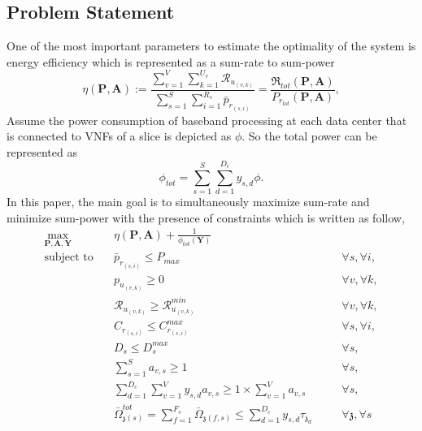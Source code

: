 \documentclass[conference]{IEEEtran}
\begin{document}
\subsection{Problem Statement}
One of the most important parameters to estimate the optimality of the system is energy efficiency which is represented as a sum-rate to sum-power 
\begin{equation}
\eta(\boldsymbol{P},\boldsymbol{A}) := \frac{\sum\limits_{v=1}^{V} \sum\limits_{k=1}^{{U}_v}\mathcal{R}_{u_{(v,k)}} }{\sum\limits_{s=1}^{S} \sum\limits_{i=1}^{{R}_s}\bar{p}_{r_{(s,i)}}} = \frac{\mathfrak{R}_{tot}(\boldsymbol{P},\boldsymbol{A})}{P_{r_{tot}}(\boldsymbol{P},\boldsymbol{A})},
\end{equation}
Assume the power consumption of baseband processing at each data center that is connected to VNFs of a slice is depicted as
$\phi$. So the total power can be represented as  
\begin{equation*}
\phi_{tot} = \sum_{s=1}^{S}\sum_{d=1}^{D_c}y_{s,d}\phi.
\end{equation*} 
In this paper, the main goal is to simultaneously maximize sum-rate and minimize sum-power with the presence of constraints which is written as follow, 
\begin{subequations}
\begin{alignat}{4}
\max\limits_{\boldsymbol{P}, \boldsymbol{A}, \boldsymbol{Y} }   \quad &   \eta(\boldsymbol{P},\boldsymbol{A})+\frac{1}{\phi_{tot}(\boldsymbol{Y})} \\
\text{subject to} \quad  & \bar{p}_{r_{(s,i)}} \leq P_{max} && \quad \forall s, \forall i, 
 \label{c11} \\
&p_{u_{(v,k)}}  \geq 0  &&\quad \forall v, \forall k,\label{c12} \\
&\mathcal{R}_{u_{(v,k)}} \geq  \mathcal{R}_{u_{(v,k)}}^{min} && \quad \forall v, \forall k,\label{c13} \\                                 
&C_{r_{(s,i)}} \leq C_{r_{(s,i)}}^{max}  &&\quad \forall s, \forall i, \label{c14}\\
&D_{s} \leq D_{s}^{max}  &&\quad \forall s,\label{c15} \\
& \sum_{s=1}^{S}a_{v,s} \geq 1 &&\quad \forall s, \label{c21} \\
& \sum_{d=1}^{D_c}\sum_{v=1}^{V}y_{s,d}a_{v,s} \geq 1\times\sum_{v=1}^{V}a_{v,s} &&\quad \forall s,\label{c23} \\
& \bar{\Omega}_{\mathfrak{z}(s)}^{tot} = \sum_{f=1}^{F_s}\bar{\Omega}_{\mathfrak{z}(f,s)} \leq  \sum_{d=1}^{D_c} y_{s,d} \tau_{\mathfrak{z}_d}                      
 && \quad \forall \mathfrak{z}, \forall s  \label{c22}
\end{alignat}
\label{constraints}
\end{subequations}
\end{document}
